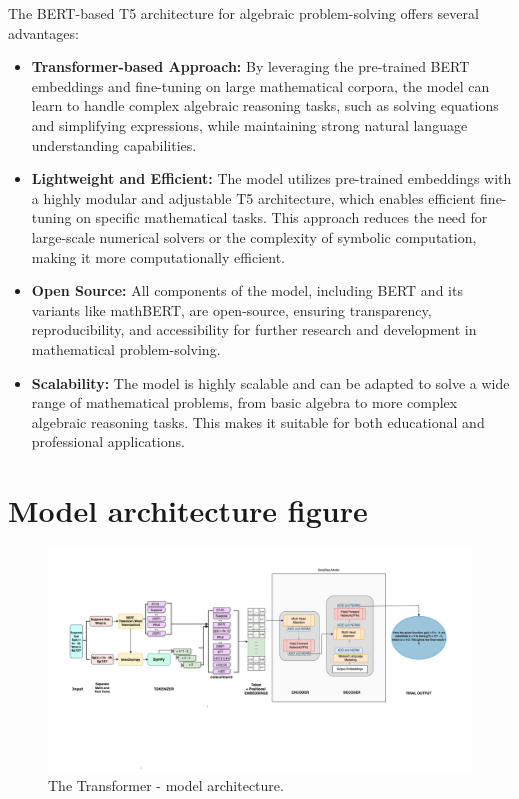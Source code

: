 \documentclass{article}
\begin{document}
The BERT-based T5 architecture for algebraic problem-solving offers several advantages:

\begin{itemize} \item \textbf{Transformer-based Approach:} By leveraging the pre-trained BERT embeddings and fine-tuning on large mathematical corpora, the model can learn to handle complex algebraic reasoning tasks, such as solving equations and simplifying expressions, while maintaining strong natural language understanding capabilities. \item \textbf{Lightweight and Efficient:} The model utilizes pre-trained embeddings with a highly modular and adjustable T5 architecture, which enables efficient fine-tuning on specific mathematical tasks. This approach reduces the need for large-scale numerical solvers or the complexity of symbolic computation, making it more computationally efficient. \item \textbf{Open Source:} All components of the model, including BERT and its variants like mathBERT, are open-source, ensuring transparency, reproducibility, and accessibility for further research and development in mathematical problem-solving. \item \textbf{Scalability:} The model is highly scalable and can be adapted to solve a wide range of mathematical problems, from basic algebra to more complex algebraic reasoning tasks. This makes it suitable for both educational and professional applications. \end{itemize}


\section{Model architecture figure}


\begin{figure}[H]
  \centering
  \includegraphics[scale=0.2]{./figures/Model_architecture_figure.png}
  \caption{The Transformer - model architecture.}
  \label{fig:model-arch}
\end{figure}
\end{document}
